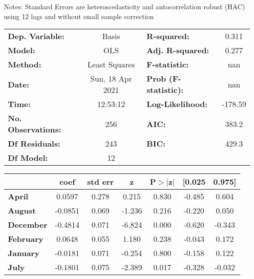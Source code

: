 Notes: \newline
 [1] Standard Errors are heteroscedasticity and autocorrelation robust (HAC) using 12 lags and without small sample correction
\begin{center}
\begin{tabular}{lclc}
\toprule
\textbf{Dep. Variable:}    &      Basis       & \textbf{  R-squared:         } &     0.311   \\
\textbf{Model:}            &       OLS        & \textbf{  Adj. R-squared:    } &     0.277   \\
\textbf{Method:}           &  Least Squares   & \textbf{  F-statistic:       } &       nan   \\
\textbf{Date:}             & Sun, 18 Apr 2021 & \textbf{  Prob (F-statistic):} &      nan    \\
\textbf{Time:}             &     12:53:12     & \textbf{  Log-Likelihood:    } &   -178.59   \\
\textbf{No. Observations:} &         256      & \textbf{  AIC:               } &     383.2   \\
\textbf{Df Residuals:}     &         243      & \textbf{  BIC:               } &     429.3   \\
\textbf{Df Model:}         &          12      & \textbf{                     } &             \\
\bottomrule
\end{tabular}
\begin{tabular}{lcccccc}
                   & \textbf{coef} & \textbf{std err} & \textbf{z} & \textbf{P$> |$z$|$} & \textbf{[0.025} & \textbf{0.975]}  \\
\midrule
\textbf{April}     &       0.0597  &        0.278     &     0.215  &         0.830        &       -0.485    &        0.604     \\
\textbf{August}    &      -0.0851  &        0.069     &    -1.236  &         0.216        &       -0.220    &        0.050     \\
\textbf{December}  &      -0.4814  &        0.071     &    -6.824  &         0.000        &       -0.620    &       -0.343     \\
\textbf{February}  &       0.0648  &        0.055     &     1.180  &         0.238        &       -0.043    &        0.172     \\
\textbf{January}   &      -0.0181  &        0.071     &    -0.254  &         0.800        &       -0.158    &        0.122     \\
\textbf{July}      &      -0.1801  &        0.075     &    -2.389  &         0.017        &       -0.328    &       -0.032     \\

\end{tabular}
\end{center}
